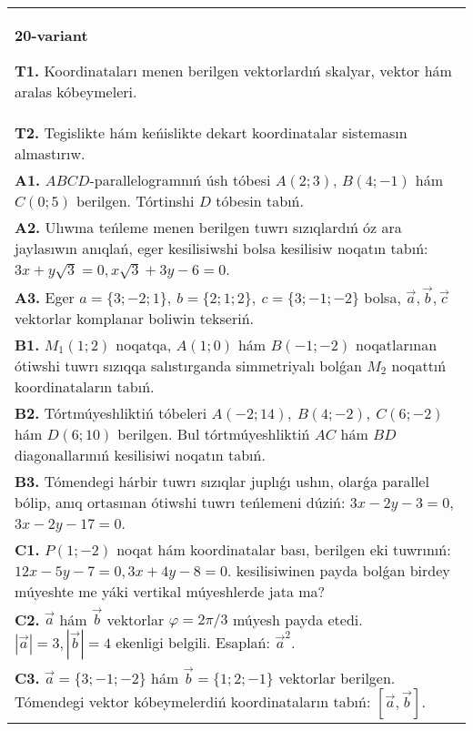 \documentclass{article}
\begin{document}
\begin{tabular}{m{17cm}}
\textbf{20-variant}

\textbf{T1.} 
Koordinataları menen berilgen vektorlardıń skalyar, vektor hám aralas kóbeymeleri.
 \\
\textbf{T2.} 
Tegislikte hám keńislikte dekart koordinatalar sistemasın almastırıw.
 \\
\textbf{A1.} 
$ABCD$-parallelogramnıń úsh tóbesi
$A (2;3) $, $B (4;-1) $ hám $C (0;5) $ berilgen. Tórtinshi $D$
tóbesin tabıń.
 \\
\textbf{A2.} 
Ulıwma teńleme menen berilgen tuwrı sızıqlardıń
óz ara jaylasıwın anıqlań, eger kesilisiwshi bolsa kesilisiw noqatın
tabıń: $3x+y\sqrt{3}=0, x\sqrt{3}+3y-6=0$.
 \\
\textbf{A3.} 
Eger \(a = \{ 3; - 2;1\}, \ b = \{ 2;1;2\}, \ c = \{ 3; - 1; - 2\}\) bolsa, $\overrightarrow{a}, \overrightarrow{b}, \overrightarrow{c}$ vektorlar komplanar boliwin tekseriń.
 \\
\textbf{B1.} 
\(M_{1} (1;2) \) noqatqa, \(A (1;0) \) hám \(B (-1;-2) \)
noqatlarınan ótiwshi tuwrı sızıqqa salıstırganda simmetriyalı bolǵan \(M_{2}\) noqattıń koordinataların tabıń.
 \\
\textbf{B2.} 
Tórtmúyeshliktiń tóbeleri
\(A (-2;14),\ B (4;-2),\ C (6;-2) \) hám \(D (6;10) \) berilgen. Bul
tórtmúyeshliktiń $AC$ hám $BD$ diagonallarınıń kesilisiwi
noqatın tabıń.
 \\
\textbf{B3.} 
Tómendegi hárbir tuwrı sızıqlar juplıǵı ushın, olarǵa parallel
bólip, anıq ortasınan ótiwshi tuwrı teńlemeni dúziń: $3x-2y-3=0$, $3x-2y-17=0$.
 \\
\textbf{C1.} 
\(P (1;-2) \) noqat hám koordinatalar bası, berilgen eki
tuwrınıń: $12x-5y-7=0, 3x+4y-8=0$.
kesilisiwinen payda bolǵan birdey múyeshte me yáki vertikal
múyeshlerde jata ma?
 \\
\textbf{C2.} 
$\vec{a}$ hám $\vec{b}$ vektorlar $\varphi = 2\pi/3$ múyesh payda etedi. $|\vec{a}| = 3,|\vec{b}| = 4$ ekenligi belgili. Esaplań:
${\vec{a}}^{2}$.
 \\
\textbf{C3.} 
$\vec{a} = \{ 3; - 1; - 2\}$ hám $\vec{b} = \{ 1;2; - 1\}$ vektorlar berilgen. Tómendegi vektor kóbeymelerdiń koordinataların tabıń:
$\left\lbrack \vec{a},\vec{b} \right\rbrack$.
 \\

\end{tabular}
\vspace{1cm}
\end{document}
